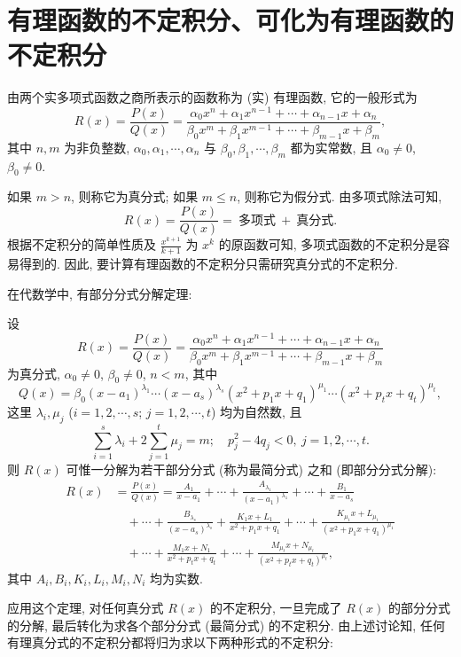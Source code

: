 \section{有理函数的不定积分、可化为有理函数的不定积分}\label{sec:5.3}

由两个实多项式函数之商所表示的函数称为 (实) 有理函数, 它的一般形式为
\[
R(x)=\frac{P(x)}{Q(x)}
=\frac{\alpha_{0}x^{n}+\alpha_{1}x^{n-1}+\cdots+\alpha_{n-1}x+\alpha_{n}}
{\beta_{0}x^{m}+\beta_{1}x^{m-1}+\cdots+\beta_{m-1}x+\beta_{m}},
\]
其中 $n,m$ 为非负整数, $\alpha_{0},\alpha_{1},\cdots,\alpha_{n}$ 与 $\beta_{0},\beta_{1},\cdots,\beta_{m}$ 都为实常数, 且 $\alpha_{0}\neq 0$, $\beta_{0}\neq 0$.

如果 $m>n$, 则称它为真分式; 如果 $m\leqslant n$, 则称它为假分式. 由多项式除法可知,
\[
R(x)=\frac{P(x)}{Q(x)}=\ \text{多项式}\ +\ \text{真分式}.
\]
根据不定积分的简单性质及 $\frac{x^{k+1}}{k+1}$ 为 $x^{k}$ 的原函数可知, 多项式函数的不定积分是容易得到的. 因此, 要计算有理函数的不定积分只需研究真分式的不定积分.

在代数学中, 有部分分式分解定理:

设
\[
R(x)=\frac{P(x)}{Q(x)}
=\frac{\alpha_{0}x^{n}+\alpha_{1}x^{n-1}+\cdots+\alpha_{n-1}x+\alpha_{n}}
{\beta_{0}x^{m}+\beta_{1}x^{m-1}+\cdots+\beta_{m-1}x+\beta_{m}}
\]
为真分式, $\alpha_{0}\neq 0$, $\beta_{0}\neq 0$, $n<m$, 其中
\[
Q(x)=\beta_{0}(x-a_{1})^{\lambda_{1}}\cdots(x-a_{s})^{\lambda_{s}}
(x^{2}+p_{1}x+q_{1})^{\mu_{1}}\cdots(x^{2}+p_{t}x+q_{t})^{\mu_{t}},
\]
这里 $\lambda_{i},\mu_{j}$ ($i=1,2,\cdots,s$; $j=1,2,\cdots,t$) 均为自然数, 且
\[
\sum_{i=1}^{s}\lambda_{i}+2\sum_{j=1}^{t}\mu_{j}=m;\quad p_{j}^{2}-4q_{j}<0,\ j=1,2,\cdots,t.
\]
则 $R(x)$ 可惟一分解为若干部分分式 (称为最简分式) 之和 (即部分分式分解):
\begin{align*}
R(x)&=\frac{P(x)}{Q(x)}
=\frac{A_{1}}{x-a_{1}}+\cdots+\frac{A_{\lambda_{1}}}{(x-a_{1})^{\lambda_{1}}}+\cdots+\frac{B_{1}}{x-a_{s}}\\
&\quad+\cdots+\frac{B_{\lambda_{s}}}{(x-a_{s})^{\lambda_{s}}}
+\frac{K_{1}x+L_{1}}{x^{2}+p_{1}x+q_{1}}+\cdots+\frac{K_{\mu_{1}}x+L_{\mu_{1}}}{(x^{2}+p_{1}x+q_{1})^{\mu_{1}}}\\
&\quad+\cdots+\frac{M_{1}x+N_{1}}{x^{2}+p_{t}x+q_{t}}+\cdots+\frac{M_{\mu_{t}}x+N_{\mu_{t}}}{(x^{2}+p_{t}x+q_{t})^{\mu_{t}}},
\end{align*}
其中 $A_{i},B_{i},K_{i},L_{i},M_{i},N_{i}$ 均为实数.

应用这个定理, 对任何真分式 $R(x)$ 的不定积分, 一旦完成了 $R(x)$ 的部分分式的分解, 最后转化为求各个部分分式 (最简分式) 的不定积分. 由上述讨论知, 任何有理真分式的不定积分都将归为求以下两种形式的不定积分:

